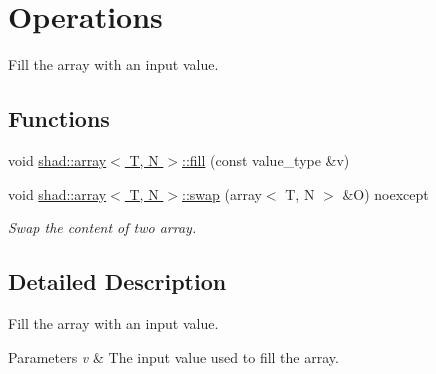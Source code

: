 \hypertarget{group__Operations}{\section{Operations}
\label{group__Operations}
}


Fill the array with an input value.  


\subsection*{Functions}
\begin{DoxyCompactItemize}
\item 
void \hyperlink{group__Operations_gabf303c3ba4e769b45c226523225034a3}{shad\-::array$<$ T, N $>$\-::fill} (const value\-\_\-type \&v)
\item 
void \hyperlink{group__Operations_ga9914edf5870a790ad4e5fb4db7556aaa}{shad\-::array$<$ T, N $>$\-::swap} (array$<$ T, N $>$ \&O) noexcept
\begin{DoxyCompactList}\small\item\em Swap the content of two array. \end{DoxyCompactList}\end{DoxyCompactItemize}


\subsection{Detailed Description}
Fill the array with an input value. 
\begin{DoxyParams}{Parameters}
{\em v} & The input value used to fill the array. \\
\hline
\end{DoxyParams}



